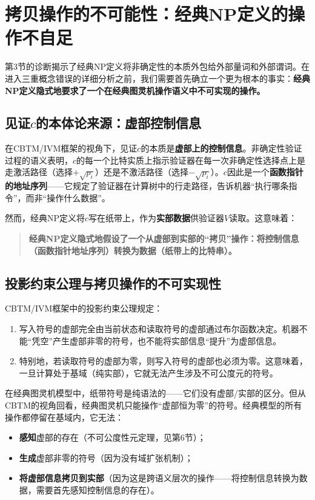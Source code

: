 \documentclass{ctexart}
\begin{document}
	\section{拷贝操作的不可能性：经典NP定义的操作不自足}
	
	第3节的诊断揭示了经典NP定义将非确定性的本质外包给外部量词和外部谓词。在进入三重概念错误的详细分析之前，我们需要首先确立一个更为根本的事实：\textbf{经典NP定义隐式地要求了一个在经典图灵机操作语义中不可实现的操作。}
	
	\subsection{见证$c$的本体论来源：虚部控制信息}
	
	在CBTM/IVM框架的视角下，见证$c$的本质是\textbf{虚部上的控制信息}。非确定性验证过程的语义表明，$c$的每一个比特实质上指示验证器在每一次非确定性选择点上是走激活路径（选择$+\sqrt{p_i}$）还是不激活路径（选择$-\sqrt{p_i}$）。$c$因此是一个\textbf{函数指针的地址序列}——它规定了验证器在计算树中的行走路径，告诉机器``执行哪条指令''，而非``操作什么数据''。
	
	然而，经典NP定义将$c$写在纸带上，作为\textbf{实部数据}供验证器$V$读取。这意味着：
	
	\begin{quote}
		\textbf{经典NP定义隐式地假设了一个从虚部到实部的``拷贝''操作：将控制信息（函数指针地址序列）转换为数据（纸带上的比特串）。}
	\end{quote}
	
	\subsection{投影约束公理与拷贝操作的不可实现性}
	
	CBTM/IVM框架中的投影约束公理\cite{cbtmarxiv}规定：
	\begin{enumerate}
		\item 写入符号的虚部完全由当前状态和读取符号的虚部通过布尔函数决定。机器不能``凭空''产生虚部非零的符号，也不能将实部信息``提升''为虚部信息。
		\item 特别地，若读取符号的虚部为零，则写入符号的虚部也必须为零。这意味着，一旦计算处于基域（纯实部），它就无法产生涉及不可公度元的符号。
	\end{enumerate}
	
	在经典图灵机模型中，纸带符号是纯语法的——它们没有虚部/实部的区分。但从CBTM的视角回看，经典图灵机只能操作``虚部恒为零''的符号。经典模型的所有操作都停留在基域内，它无法：
	\begin{itemize}
		\item \textbf{感知}虚部的存在（不可公度性元定理，见第6节）；
		\item \textbf{生成}虚部非零的符号（因为没有域扩张机制）；
		\item \textbf{将虚部信息拷贝到实部}（因为这是跨语义层次的操作——将控制信息转换为数据，需要首先感知控制信息的存在）。
	\end{itemize}
	
\end{document}
